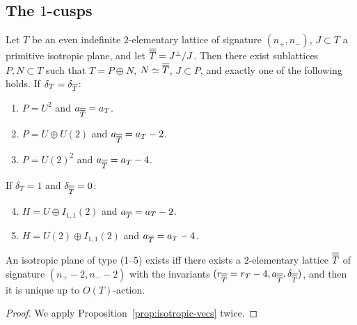 \documentclass{amsart}
\begin{document}
\subsection{The $1$-cusps}
\label{sec:1-cusps}

\begin{lemma}
  \label{lem:1-cusps}
  Let $T$ be an even indefinite $2$-elementary lattice of signature
  $(n_+,n_-)$, $J\subset T$ a primitive isotropic plane, and let
  ${\overline{\overline T}} = J^\perp/J$. Then there exist sublattices $P,N\subset T$ such
  that $T=P\oplus N$, $N\simeq{\overline{\overline T}}$, $J\subset P$, and exactly one of
  the following holds.  
  \noindent If $\delta_T=\delta_{\overline T}$: 
  \begin{enumerate}
  \item $P=U^2$ and  $a_{\overline{\overline T}}=a_T$.
  \item $P=U\oplus U(2)$ and  $a_{\overline{\overline T}}=a_T-2$.
  \item $P=U(2)^2$ and  $a_{\overline{\overline T}}=a_T-4$.
  \end{enumerate}
  If $\delta_T=1$ and $\delta_{\overline{\overline T}}=0$: 
  \begin{enumerate}\setcounter{enumi}{3}
  \item $H=U \oplus I_{1,1}(2)$ and $a_{\overline T} = a_T-2$.
  \item $H=U(2) \oplus I_{1,1}(2)$ and $a_{\overline T} = a_T-4$.
  \end{enumerate}
  
  An isotropic plane of type (1--5) exists iff there exists a
  $2$-elementary lattice ${\overline{\overline T}}$ of signature $(n_+-2,n_--2)$ with the
  invariants $(r_{\overline{\overline T}}=r_T-4, a_{\overline{\overline T}}, \delta_{\overline{\overline T}})$, and then it is unique
  up to $O(T)$-action.
\end{lemma}
\begin{proof}
  We apply Proposition~\ref{prop:isotropic-vecs} twice.
\end{proof}
\end{document}
